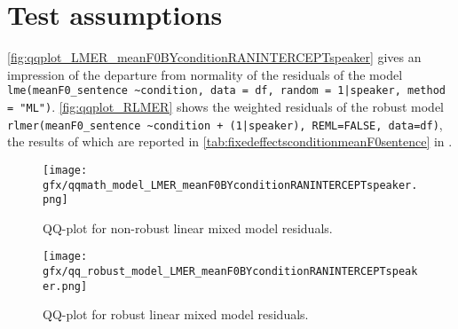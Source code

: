 \chapter{Test assumptions}\label{app:AppendixD}

\autoref{fig:qqplot_LMER_meanF0BYconditionRANINTERCEPTspeaker} gives an impression of the departure from normality of the residuals of the model \texttt{lme(meanF0\_sentence \sim condition, data = df, random = 1|speaker, method = "ML")}. \autoref{fig:qqplot_RLMER} shows the weighted residuals of the robust model  \texttt{rlmer(meanF0\_sentence \sim condition + (1|speaker), REML=FALSE, data=df)}, the results of which are reported in \autoref{tab:fixedeffectsconditionmeanF0sentence} in .

\begin{figure}[H]
	\texttt{[image: gfx/qqmath\_model\_LMER\_meanF0BYconditionRANINTERCEPTspeaker.png]}
	\caption{QQ-plot for non-robust linear mixed model residuals.}\label{fig:qqplot_LMER_meanF0BYconditionRANINTERCEPTspeaker}
\end{figure}

\begin{figure}
	\texttt{[image: gfx/qq\_robust\_model\_LMER\_meanF0BYconditionRANINTERCEPTspeaker.png]}
	\caption{QQ-plot for robust linear mixed model residuals.}\label{fig:qqplot_RLMER}
\end{figure}

